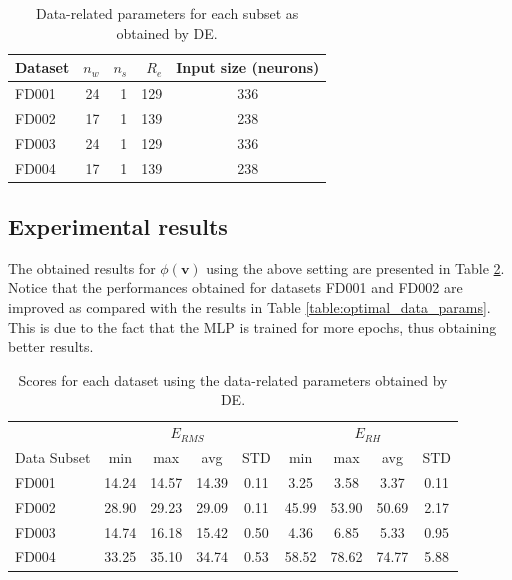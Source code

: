 \documentclass[preprint,12pt]{elsarticle}%
\begin{document}
\begin{table}[H]
\begin{center}
\begin{tabular}[c]{l r r r c}\hline
Dataset & $n_{w}$ & $n_{s}$ & $R_{e}$ & Input size (neurons) \\\hline
FD001 & 24 & 1 & 129 & 336\\
FD002 & 17 & 1 & 139 & 238\\
FD003 & 24 & 1 & 129 & 336\\
FD004 & 17 & 1 & 139 & 238\\\hline
\end{tabular}
\caption{Data-related parameters for each subset as obtained by DE.}
\label{table:data_params_de}
\end{center}
\end{table}

\subsection{Experimental results}
\label{sec:experimental_results}

The obtained results for $\phi(\mathbf{v})$ using the above setting are presented in Table \ref{table:results_ann_de}. Notice that the performances obtained for datasets FD001 and FD002 are improved as compared with the results in Table \ref{table:optimal_data_params}. This is due to the fact that the MLP is trained for more epochs, thus obtaining better results.

\begin{table}[H]
\begin{center}
\begin{tabular}[c]{l|cccc|cccc}\hline
& \multicolumn{4}{|c}{$E_{\scriptscriptstyle RMS}$} & \multicolumn{4}{|c}{$E_{\scriptscriptstyle RH}$}\\
Data Subset & min & max & avg & STD & min & max & avg & STD\\\hline
FD001 & 14.24 & 14.57 & 14.39 & 0.11 & 3.25 & 3.58 & 3.37 & 0.11\\
FD002 & 28.90 & 29.23 & 29.09 & 0.11 & 45.99 & 53.90 & 50.69 & 2.17\\
FD003 & 14.74 & 16.18 & 15.42 & 0.50 & 4.36 & 6.85 & 5.33 & 0.95\\
FD004 & 33.25 & 35.10 & 34.74 & 0.53 & 58.52 & 78.62 & 74.77 & 5.88\\\hline
\end{tabular}
\caption{Scores for each dataset using the data-related parameters obtained by DE.}
\label{table:results_ann_de}
\end{center}
\end{table}
\end{document}
